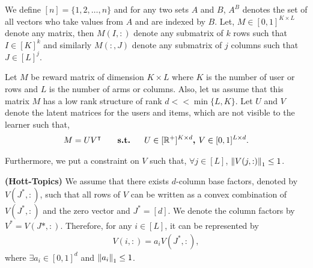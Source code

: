 We define $[n] = \lbrace 1,2,\ldots, n\rbrace$ and for any two sets $A$ and $B$, $A^B$ denotes the set of all vectors who take values from $A$ and are indexed by $B$. Let, $M\in [0,1]^{K\times L}$ denote any matrix, then $M(I,:)$ denote any submatrix of $k$ rows such that $I\in[K]^k$ and similarly $M(:,J)$ denote any submatrix of $j$ columns such that $J\in[L]^{j}$.
	
	Let $M$ be reward matrix of  dimension $K\times L$ where $K$ is the number of user or rows and $L$ is the number of arms or columns. Also, let us assume that this matrix  $M$ has a low rank structure of rank $d << \min\lbrace L,K\rbrace$. Let $U$ and $V$ denote the latent matrices for the users and items, which are not visible to the learner such that,
\begin{align*}
	M = UV^{\intercal} \textbf{ \hspace*{4mm}   s.t.   \hspace*{4mm}} U\in [ \mathbb{R}^+ ]^{K\times d} \textbf{, } V\in  [0,1]^{L\times d}.
\end{align*}	  
	
	Furthermore, we put a constraint on $V$ such that, $\forall j\in [L]$, $ \left\lVert V(j,:)\right\rVert_1 \leq 1$. 
	
	
\begin{assumption}\textbf{(Hott-Topics)}
\label{assm:hott-topics}
We assume that there exists $d$-column base factors, denoted by $V(J^*,:)$, such that all rows of $V$ can be written as a convex combination of $V(J^*,:)$ and the zero vector and $J^* = [d]$. We denote the column factors by $V^* = V(J*,:)$. Therefore, for any $i\in [L]$, it can be represented by
\begin{align*}
V(i,:) = a_i V(J^*,:) , 
\end{align*}
where $\exists a_i\in [0,1]^{d}$ and $ \left\lVert a_i\right\rVert_1 \leq 1$.
\end{assumption}



